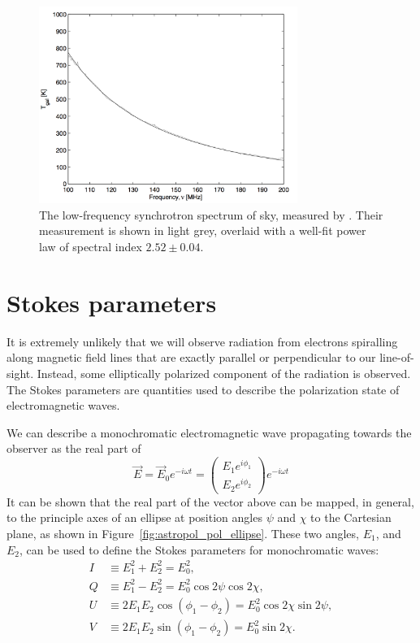 \begin{figure}
\centering
\includegraphics[width=0.75\textwidth]{chapters/astropol/figures/edges_spectrum.png}
\caption[The low-frequency synchrotron spectrum of the sky, as measured by \cite{Rogers.08}.]{The low-frequency synchrotron spectrum of sky, measured by \cite{Rogers.08}. Their measurement is shown in light grey, overlaid with a well-fit power law of spectral index $2.52\pm0.04$.}
\label{fig:astropol_edges_spec}
\end{figure}

\section{Stokes parameters}

It is extremely unlikely that we will observe radiation from electrons spiralling along magnetic field lines that are exactly parallel or perpendicular to our line-of-sight. Instead, some elliptically polarized component of the radiation is observed. The Stokes parameters are quantities used to describe the polarization state of electromagnetic waves.

We can describe a monochromatic electromagnetic wave propagating towards the observer as the real part of 
\begin{equation}
\vec{E} = \vec{E}_0e^{-i\omega t} = \begin{pmatrix}
E_1 e^{i\phi_1}\\
E_2 e^{i\phi_2}
\end{pmatrix}e^{-i\omega t}
\end{equation}
It can be shown \citep[e.g.][]{Rybicki.79} that the real part of the vector above can be mapped, in general, to the principle axes of an ellipse at position angles $\psi$ and $\chi$ to the Cartesian plane, as shown in Figure~\ref{fig:astropol_pol_ellipse}. These two angles, $E_1$, and $E_2$, can be used to define the Stokes parameters for monochromatic waves:
\begin{align}
I &\equiv E_1^2 + E_2^2 = E_0^2, \\
Q &\equiv E_1^2 - E_2^2 = E_0^2\cos 2\psi \cos 2\chi,\\
U &\equiv 2E_1E_2\cos(\phi_1 - \phi_2) = E_0^2\cos 2\chi \sin 2\psi, \\
V &\equiv 2E_1E_2\sin(\phi_1 - \phi_2) = E_0^2\sin 2\chi.
\end{align}

